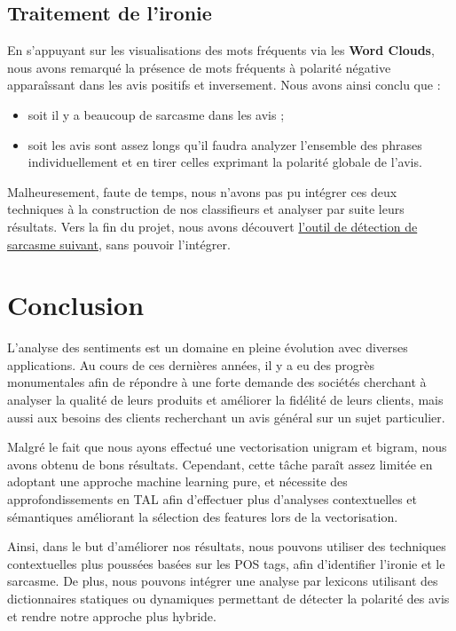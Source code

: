 \documentclass[12pt,a4paper]{report}
\theoremstyle{definition}
\begin{document}
\section{Traitement de l'ironie}
En s'appuyant sur les visualisations des mots fréquents via les \textbf{Word Clouds}, nous avons remarqué la présence de mots fréquents à polarité négative apparaîssant dans les avis positifs et inversement. Nous avons ainsi conclu que :
\begin{itemize}
  \item soit il y a beaucoup de sarcasme dans les avis ;
  \item soit les avis sont assez longs qu'il faudra analyzer l'ensemble des phrases individuellement et en tirer celles exprimant la polarité globale de l'avis.
\end{itemize}

Malheuresement, faute de temps, nous n'avons pas pu intégrer ces deux techniques à la construction de nos classifieurs et analyser par suite leurs résultats. Vers la fin du projet, nous avons découvert \href{https://github.com/MirunaPislar/Sarcasm-Detection}{l'outil de détection de sarcasme suivant}, sans pouvoir l'intégrer.

\chapter{Conclusion}
L'analyse des sentiments est un domaine en pleine évolution avec diverses applications. Au cours de ces dernières années, il y a eu des progrès monumentales afin de répondre à une forte demande des sociétés cherchant à analyser la qualité de leurs produits et améliorer la fidélité de leurs clients, mais aussi aux besoins des clients recherchant un avis général sur un sujet particulier.

Malgré le fait que nous ayons effectué une vectorisation unigram et bigram, nous avons obtenu de bons résultats. Cependant, cette tâche paraît assez limitée en adoptant une approche machine learning pure, et nécessite des approfondissements en TAL afin d'effectuer plus d'analyses contextuelles et sémantiques améliorant la sélection des features lors de la vectorisation.

Ainsi, dans le but d'améliorer nos résultats, nous pouvons utiliser des techniques contextuelles plus poussées basées sur les POS tags, afin d'identifier l'ironie et le sarcasme. De plus, nous pouvons intégrer une analyse par lexicons utilisant des dictionnaires statiques ou dynamiques permettant de détecter la polarité des avis et rendre notre approche plus hybride.
\end{document}
